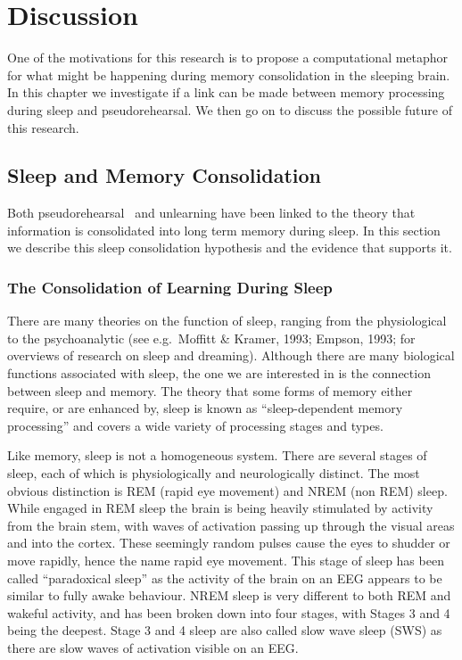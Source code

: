 
\chapter{Discussion}
\label{chap:Discussion}

One of the motivations for this research is to propose a computational metaphor for what might be happening during memory consolidation in the sleeping brain. In this chapter we investigate if a link can be made between memory processing during sleep and pseudorehearsal.  We then go on to discuss the possible future of this research.

\section{Sleep and Memory Consolidation}

Both pseudorehearsal~\citep{Robins1998} and unlearning \citep{Crick1983} have been linked to the theory that information is consolidated into long term memory during sleep. In this section we describe this sleep consolidation hypothesis and the evidence that supports it.  


\subsection{The Consolidation of Learning During Sleep}

There are many theories on the function of sleep, ranging from the physiological to the psychoanalytic (see e.g.\ Moffitt \& Kramer, 1993; Empson, 1993; for overviews of research on sleep and dreaming). Although there are many biological functions associated with sleep, the one we are interested in is the connection between sleep and memory. The theory that some forms of memory either require, or are enhanced by, sleep is known as ``sleep-dependent memory processing'' \citep{Walker2006} and covers a wide variety of processing stages and types.  

Like memory, sleep is not a homogeneous system.  There are several stages of sleep, each of which is physiologically and neurologically distinct.  The most obvious distinction is REM (rapid eye movement) and NREM (non REM) sleep.  While engaged in REM sleep the brain is being heavily stimulated by activity from the brain stem, with waves of activation passing up through the visual areas and into the cortex.  These seemingly random pulses cause the eyes to shudder or move rapidly, hence the name rapid eye movement.  This stage of sleep has been called ``paradoxical sleep'' as the activity of the brain on an EEG appears to be similar to fully awake behaviour.  NREM sleep is very different to both REM and wakeful activity, and has been broken down into four stages, with Stages 3 and 4 being the deepest.  Stage 3 and 4 sleep are also called slow wave sleep (SWS) as there are slow waves of activation visible on an EEG.
 
